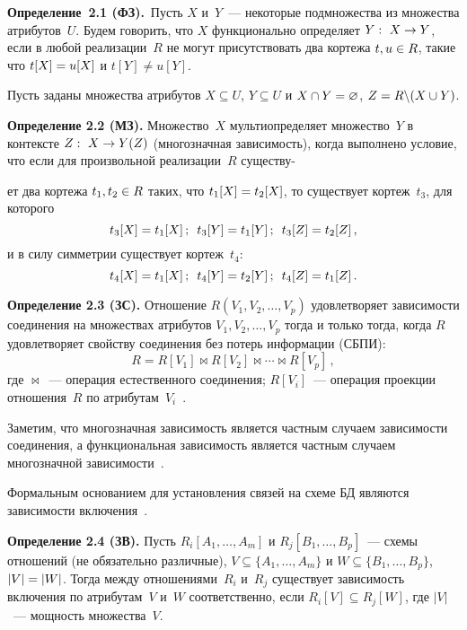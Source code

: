 \begin{multicols}{2}
{}
  
  \medskip
  
  \noindent
  \textbf{Определение~2.1 (ФЗ).}\ Пусть $X$ и~$Y$~--- некоторые 
подмножества из множества атрибутов~$U$. Будем говорить, что $X$ 
функционально определяет $Y:\ X\hm\to Y$, если в любой реализации~$R$ не 
могут присутствовать два кортежа $t,u\hm\in R$, такие что $t[X]\hm=u[X]$ и 
$t[Y]\not= u[Y]$.

  \smallskip
  
  Пусть заданы множества атрибутов $X\subseteq U$, $Y\subseteq U$ и $X\cap 
Y\hm=\varnothing$, $Z\hm=R\backslash (X\cup Y)$.
  
  \medskip
  
  \noindent
  \textbf{Определение 2.2 (МЗ).} Множество~$X$ мультиопределяет 
множество~$Y$ в контексте $Z:\ X\hm\to Y(Z)$ (многозначная зависимость), 
когда выполнено условие, что если для произвольной реализации~$R$ 
существу-\linebreak\vspace*{-12pt}

\pagebreak

\noindent
ет два кортежа $t_1,t_2\hm\in R$ таких, что $t_1[X]\hm=t_2[X]$, то 
существует кортеж~$t_3$, для которого
  $$
t_3[X]=t_1[X]\,;\enskip  t_3[Y]=t_1[Y]\,;\enskip  t_3[Z]=t_2[Z]\,,
$$
и в силу симметрии существует кортеж~$t_4$:
$$
t_4[X]=t_1[X]\,;\enskip  t_4[Y]=t_2[Y]\,;\enskip  t_4[Z]=t_1[Z]\,.
$$

  \noindent
  \textbf{Определение 2.3 (ЗС).} Отношение $R(V_1, V_2, \ldots , V_p)$ 
удовлетворяет зависимости соединения на множествах атрибутов $V_1, V_2, 
\ldots , V_p$ тогда и только тогда, когда $R$ удовлетворяет свойству 
соединения без потерь информации (СБПИ):
  $$
R=R[V_1]\bowtie R[V_2]\bowtie \cdots\bowtie R[V_p]\,,
$$
где $\bowtie$~--- операция естественного соединения; $R[V_i]$~--- операция 
проекции отношения~$R$ по атрибутам~$V_i$~\cite{10-z}.
  
  \smallskip
  
  Заметим, что многозначная зависимость является частным случаем 
зависимости соединения, а функциональная зависимость является частным 
случаем многозначной зависимости~\cite{10-z, 11-z}.
  
  Формальным основанием для установления связей на схеме БД являются 
зависимости включения~\cite{12-z}.
  
  \smallskip
  
  \noindent
  \textbf{Определение 2.4 (ЗВ).} Пусть $R_i[A_1, \ldots , A_m]$ и $R_j[B_1, 
\ldots , B_p]$~--- схемы отношений (не обязательно различные), $V\subseteq 
\{A_1, \ldots , A_m\}$ и $W\subseteq \{B_1, \ldots , B_p\}$, $\vert V\vert \hm= \vert 
W \vert$. Тогда между отношениями~$R_i$ и~$R_j$ существует зависимость 
включения по атрибутам~$V$ и~$W$ соответственно, если $R_i[V] \subseteq  
R_j[W]$, где $\vert V\vert$~--- мощность множества~$V$.
  

\end{multicols}
